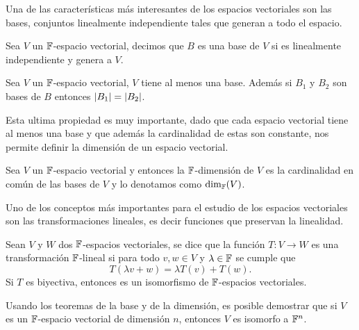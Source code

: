 Una de las características más interesantes de los espacios vectoriales son las bases, conjuntos linealmente independiente tales que generan a todo el espacio.
\begin{defi}
  Sea $V$ un $\mathbb{F}$-espacio vectorial, decimos que $B$ es una base de $V$ si es linealmente independiente y genera a $V$.
\end{defi}

\begin{teor}
  Sea $V$ un $\mathbb{F}$-espacio vectorial, $V$ tiene al menos una base. Además si $B_1$ y $B_2$ son bases de $B$ entonces $\mathopen|B_1\mathclose| = \mathopen|B_2\mathclose|$.
\end{teor}

Esta ultima propiedad es muy importante, dado que cada espacio vectorial tiene al menos una base y que además la cardinalidad de estas son constante, nos permite definir la dimensión de un espacio vectorial.

\begin{defi}
  Sea $V$ un $\mathbb{F}$-espacio vectorial y entonces la $\mathbb{F}$-dimensión de $V$ es la cardinalidad en común de las bases de $V$ y lo denotamos como $\dim_{\mathbb{F}}(V)$.
\end{defi}

Uno de los conceptos más importantes para el estudio de los espacios vectoriales son las transformaciones lineales, es decir funciones que preservan la linealidad.

\begin{defi}
  Sean $V$ y $W$ dos $\mathbb{F}$-espacios vectoriales, se dice que la función $T\colon V\to W$ es una transformación $\mathbb{F}$-lineal si para todo $v,w \in V$ y $\lambda \in \mathbb{F}$ se cumple que 
  \[ T(\lambda v + w) = \lambda T(v) + T(w).\]
  Si $T$ es biyectiva, entonces es un isomorfismo de $\mathbb{F}$-espacios vectoriales.
\end{defi}

Usando los teoremas de la base y de la dimensión, es posible demostrar que si $V$ es un $\mathbb{F}$-espacio vectorial de dimensión $n$, entonces $V$ es isomorfo a $\mathbb{F}^n$.